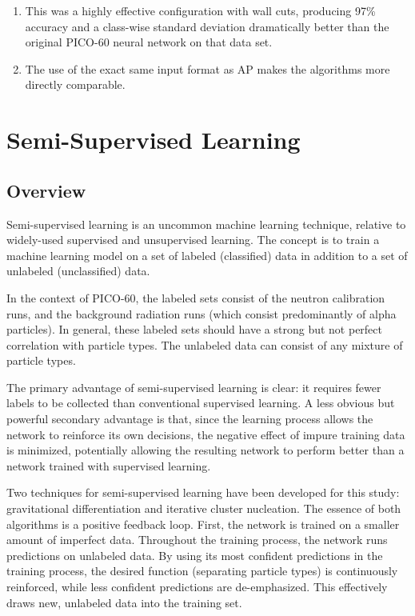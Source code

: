 \documentclass[10pt]{article}
\begin{document}
\begin{enumerate}
    \item This was a highly effective configuration with wall cuts, producing 97\% accuracy and a class-wise standard deviation dramatically better than the original PICO-60 neural network on that data set.
    \item The use of the exact same input format as AP makes the algorithms more directly comparable.
\end{enumerate}

\section{Semi-Supervised Learning} \label{semi_supervised}

\subsection{Overview}

Semi-supervised learning is an uncommon machine learning technique, relative to widely-used supervised and unsupervised learning. The concept is to train a machine learning model on a set of labeled (classified) data in addition to a set of unlabeled (unclassified) data.

In the context of PICO-60, the labeled sets consist of the neutron calibration runs, and the background radiation runs (which consist predominantly of alpha particles). In general, these labeled sets should have a strong but not perfect correlation with particle types. The unlabeled data can consist of any mixture of particle types.

The primary advantage of semi-supervised learning is clear: it requires fewer labels to be collected than conventional supervised learning. A less obvious but powerful secondary advantage is that, since the learning process allows the network to reinforce its own decisions, the negative effect of impure training data is minimized, potentially allowing the resulting network to perform better than a network trained with supervised learning.

Two techniques for semi-supervised learning have been developed for this study: gravitational differentiation and iterative cluster nucleation. The essence of both algorithms is a positive feedback loop. First, the network is trained on a smaller amount of imperfect data. Throughout the training process, the network runs predictions on unlabeled data. By using its most confident predictions in the training process, the desired function (separating particle types) is continuously reinforced, while less confident predictions are de-emphasized. This effectively draws new, unlabeled data into the training set.
\end{document}
